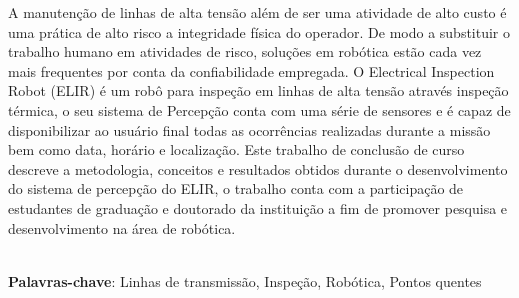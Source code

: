 \begin{thesisresumo}
A manutenção de linhas de alta tensão além de ser uma atividade de alto custo é uma prática de alto risco a integridade física do operador. De modo a substituir o trabalho humano em atividades de risco, soluções em robótica estão cada vez mais frequentes por conta da confiabilidade empregada. O Electrical Inspection Robot (ELIR) é um robô para inspeção em linhas de alta tensão através inspeção térmica, o seu sistema de Percepção conta com uma série de sensores e é capaz de disponibilizar ao usuário final todas as ocorrências realizadas durante a missão bem como data, horário e localização. Este trabalho de conclusão de curso descreve a metodologia, conceitos e resultados obtidos durante o desenvolvimento do sistema de percepção do ELIR, o trabalho conta com a participação de estudantes de graduação e doutorado da instituição a fim de promover pesquisa e desenvolvimento na área de robótica.

\ \\


\textbf{Palavras-chave}: Linhas de transmissão, Inspeção, Robótica, Pontos quentes

\end{thesisresumo}
